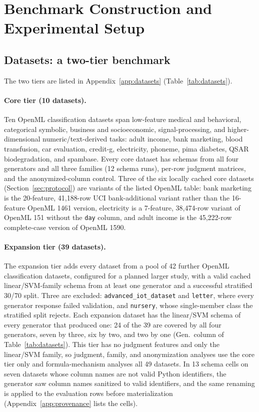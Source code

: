 \section{Benchmark Construction and Experimental Setup}\label{sec:experimental-setup}

\subsection{Datasets: a two-tier benchmark}\label{sec:datasets}

The two tiers are listed in Appendix~\ref{app:datasets} (Table~\ref{tab:datasets}).

\paragraph{Core tier (10 datasets).}

Ten OpenML \citep{vanschoren2014openml} classification datasets span low-feature medical and behavioral, categorical symbolic, business and socioeconomic, signal-processing, and higher-dimensional numeric/text-derived tasks: adult income, bank marketing, blood transfusion, car evaluation, credit-g, electricity, phoneme, pima diabetes, QSAR biodegradation, and spambase. Every core dataset has schemas from all four generators and all three families (12 schema runs), per-row judgment matrices, and the anonymized-column control. Three of the six locally cached core datasets (Section~\ref{sec:protocol}) are variants of the listed OpenML table: bank marketing is the 20-feature, 41,188-row UCI bank-additional variant rather than the 16-feature OpenML 1461 version, electricity is a 7-feature, 38,474-row variant of OpenML 151 without the \texttt{day} column, and adult income is the 45,222-row complete-case version of OpenML 1590.

\paragraph{Expansion tier (39 datasets).}

The expansion tier adds every dataset from a pool of 42 further OpenML classification datasets, configured for a planned larger study, with a valid cached linear/SVM-family schema from at least one generator and a successful stratified 30/70 split. Three are excluded: \texttt{advanced\_iot\_dataset} and \texttt{letter}, where every generator response failed validation, and \texttt{nursery}, whose single-member class the stratified split rejects. Each expansion dataset has the linear/SVM schema of every generator that produced one: 24 of the 39 are covered by all four generators, seven by three, six by two, and two by one (Gen.\ column of Table~\ref{tab:datasets}). This tier has no judgment features and only the linear/SVM family, so judgment, family, and anonymization analyses use the core tier only and formula-mechanism analyses all 49 datasets. In 13 schema cells on seven datasets whose column names are not valid Python identifiers, the generator saw column names sanitized to valid identifiers, and the same renaming is applied to the evaluation rows before materialization (Appendix~\ref{app:provenance} lists the cells).

